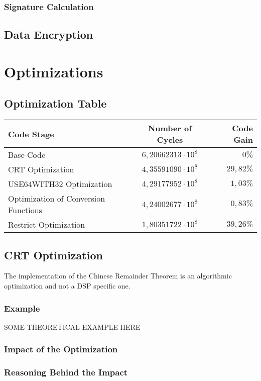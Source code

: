 \documentclass[a4paper]{article}
\begin{document}
\subsubsection{Signature Calculation}

\subsection{Data Encryption}

\section{Optimizations}
\subsection{Optimization Table}
\begin{center}
	\begin{tabular}{| l | c | r |}
		\hline
		Code Stage & Number of Cycles & Code Gain \\ \hline
		Base Code & $6,20662313 \cdot 10^{8}$ 	& $0\%$ \\
		CRT Optimization & $4,35591090 \cdot 10^{8}$ & $29,82\%$ \\
		USE64WITH32 Optimization 	& $4,29177952 \cdot 10^{8}$ & $1,03\%$ \\
		Optimization of Conversion Functions & $4,24002677 \cdot 10^{8}$ & $0,83\%$ \\
		Restrict Optimization	 & $1,80351722 \cdot 10^{8}$ & $39,26\%$ \\
		\hline
	\end{tabular}
\end{center}
\subsection{CRT Optimization}
	The implementation of the Chinese Remainder Theorem is an algorithmic optimization and not a DSP specific one. 
	\subsubsection{Example}
		SOME THEORETICAL EXAMPLE HERE
	\subsubsection{Impact of the Optimization}
	\subsubsection{Reasoning Behind the Impact}
\end{document}
